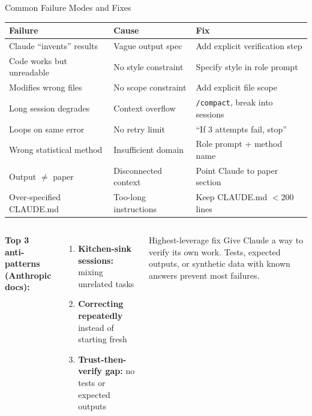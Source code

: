 \documentclass[aspectratio=169,10pt]{beamer}
\newcommand{\emphc}[1]{\textcolor{harvardcrimson}{#1}}
\begin{document}
\begin{frame}{Common Failure Modes and Fixes}
\scriptsize
\begin{center}
\renewcommand{\arraystretch}{1.1}
\begin{tabular}{p{3.5cm} p{3cm} p{5cm}}
\toprule
\textbf{Failure} & \textbf{Cause} & \textbf{Fix} \\
\midrule
Claude ``invents'' results & Vague output spec & Add explicit verification step \\
Code works but unreadable & No style constraint & Specify style in role prompt \\
Modifies wrong files & No scope constraint & Add explicit file scope \\
Long session degrades & Context overflow & \texttt{/compact}, break into sessions \\
Loops on same error & No retry limit & ``If 3 attempts fail, stop'' \\
Wrong statistical method & Insufficient domain & Role prompt + method name \\
Output $\neq$ paper & Disconnected context & Point Claude to paper section \\
Over-specified CLAUDE.md & Too-long instructions & Keep CLAUDE.md $<200$ lines \\
\bottomrule
\end{tabular}
\end{center}

\vspace{0.2em}
\begin{columns}[T]
\textbf{Top 3 anti-patterns (Anthropic docs):}
\begin{enumerate}\itemsep0pt
    \item \textbf{Kitchen-sink sessions:} mixing unrelated tasks
    \item \textbf{Correcting repeatedly} instead of starting fresh
    \item \textbf{Trust-then-verify gap:} no tests or expected outputs
\end{enumerate}

\begin{block}{Highest-leverage fix}
\tiny
\emphc{Give Claude a way to verify its own work.} Tests, expected outputs, or synthetic data with known answers prevent most failures.
\end{block}
\end{columns}
\end{frame}
\end{document}
